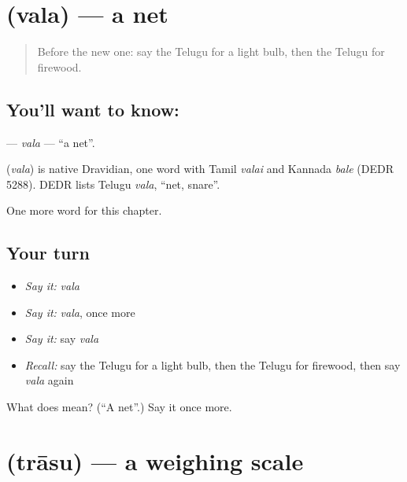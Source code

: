 \section[\texorpdfstring{\te{వల} (vala)}{వల (vala)}]{ (vala) — a net}

\label{lesson:TE-C191-vala}



\begin{quote}
Before the new one: say the Telugu for a light bulb, then the Telugu for firewood.
\end{quote}

\subsection*{You'll want to know: }
\textbf{} — \emph{vala} — \textquotedblleft{}a net\textquotedblright{}.

\begin{cousinweb}
\textbf{} (\emph{vala}) is native Dravidian, one word with Tamil \emph{valai} and Kannada \emph{bale} (DEDR 5288). DEDR lists Telugu \emph{vala}, \textquotedblleft{}net, snare\textquotedblright{}.
\end{cousinweb}

\begin{grammarlens}[title={What you've built}]
One more word for this chapter.
\end{grammarlens}

\subsection*{Your turn}
\begin{itemize}
\raggedright
  \item \emph{Say it:} \emph{vala}
  \item \emph{Say it:} \emph{vala}, once more
  \item \emph{Say it:} say \emph{vala}
  \item \emph{Recall:} say the Telugu for a light bulb, then the Telugu for firewood, then say \emph{vala} again
\end{itemize}

\begin{tcolorbox}[breakable,colback=teal!4,colframe=teal!35!black,title={Before you move on}]
What does  mean? (\textquotedblleft{}A net\textquotedblright{}.) Say it once more.
\end{tcolorbox}
\section[\texorpdfstring{\te{త్రాసు} (trāsu)}{త్రాసు (trāsu)}]{ (trāsu) — a weighing scale}

